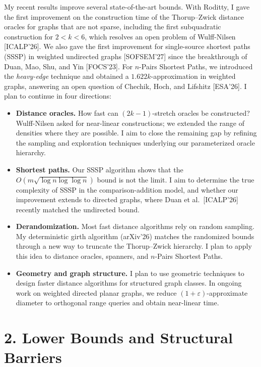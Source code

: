 \documentclass[11pt,a4paper]{article}
\begin{document}
My recent results improve several state-of-the-art bounds. With Roditty, I gave the first improvement on the construction time of the Thorup--Zwick distance oracles for graphs that are not sparse, including the first subquadratic construction for $2<k<6$, which resolves an open problem of Wulff-Nilsen [ICALP'26]. We also gave the first improvement for single-source shortest paths (SSSP) in weighted undirected graphs [SOFSEM'27] since the breakthrough of Duan, Mao, Shu, and Yin [FOCS'23]. For $n$-Pairs Shortest Paths, we introduced the \emph{heavy-edge} technique and obtained a $1.622k$-approximation in weighted graphs, answering an open question of Chechik, Hoch, and Lifshitz [ESA'26]. I plan to continue in four directions:
\begin{itemize}
  \item \textbf{Distance oracles.} How fast can $(2k-1)$-stretch oracles be constructed? Wulff-Nilsen asked for near-linear constructions; we extended the range of densities where they are possible. 
  I aim to close the remaining gap by refining the sampling and exploration techniques underlying our parameterized oracle hierarchy.
  \item \textbf{Shortest paths.} Our SSSP algorithm shows that the $O(m\sqrt{\log n\log\log n})$ bound is not the limit. I aim to determine the true complexity of SSSP in the comparison-addition model, and whether our improvement extends to directed graphs, where Duan et al.\ [ICALP'26] recently matched the undirected bound.
  \item \textbf{Derandomization.} Most fast distance algorithms rely on random sampling. My deterministic girth algorithm (arXiv'26) matches the randomized bounds through a new way to truncate the Thorup--Zwick hierarchy. I plan to apply this idea to distance oracles, spanners, and $n$-Pairs Shortest Paths.
  \item \textbf{Geometry and graph structure.} I plan to use geometric techniques to design faster distance algorithms for structured graph classes. In ongoing work on weighted directed planar graphs, we reduce $(1+\varepsilon)$-approximate diameter to orthogonal range queries and obtain near-linear time.
\end{itemize}

\section{2. Lower Bounds and Structural Barriers}
\end{document}

